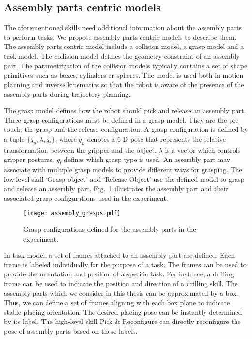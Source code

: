 \subsection{Assembly parts centric models}
The aforementioned skills need additional information about the assembly parts to perform tasks. We propose assembly parts centric models to describe them. The assembly parts centric model include a collision model, a grasp model and a task model. The collision model defines the geometry constraint of an assembly part. The parametrization of the collision models typically contains a set of shape primitives such as boxes,   cylinders or spheres. The model is used both in motion planning and inverse kinematics so that the robot is aware of the presence of the assembly-parts during trajectory planning. 

The grasp model defines how the robot should pick and release an assembly part. Three grasp configurations must be defined in a grasp model. They are the pre-touch, the grasp and the release configuration. A grasp configuration is defined by a tuple $\{g_p, \underline{\lambda}, g_t \}$, where $g_p$ denotes a 6-D pose that represents the relative transformation between the gripper and the object. $\underline{\lambda}$ is a vector which controls gripper postures. $g_t$ defines which grasp type is used. An assembly part may associate with multiple grasp models to provide different ways for grasping. The low-level skill `Grasp object' and `Release Object' use the defined model to grasp and release an assembly part. Fig.~\ref{fig:assembly_grasps} illustrates the assembly part and their associated grasp configurations used in the experiment.

\begin{figure}[!htbp]
\centering
\texttt{[image: assembly\_grasps.pdf]}
\captionsetup{justification=raggedright}
\caption{Grasp configurations defined for the assembly parts in the experiment.}
\label{fig:assembly_grasps}
\end{figure}


 In task model, a set of frames attached to an assembly part are defined. Each frame is labeled individually for the purpose of a task. The frames can be used to provide the orientation and position of a specific task. For instance, a drilling frame can be used to indicate the position and direction of  a drilling skill.  The assembly parts which we consider in this thesis can be approximated by a box. Thus, we can define a set of frames aligning with each box plane to indicate stable placing orientation. The desired placing pose can be instantly determined by its label. The high-level skill Pick \& Reconfigure can directly reconfigure the pose of assembly parts based on these labels. 

